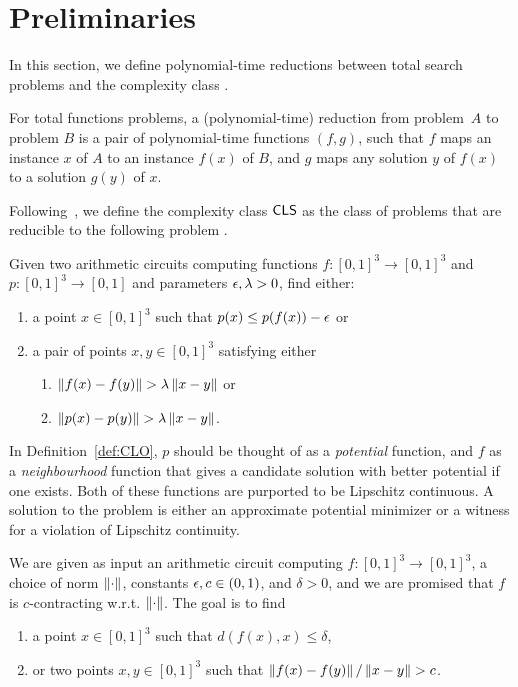 \chapter{Preliminaries}

In this section, we define polynomial-time reductions between total search problems
and the complexity class \CLS.
%
\begin{definition}
For total functions problems, a (polynomial-time) reduction from problem~$A$ to
problem $B$ is a pair of polynomial-time functions $(f,g)$, such that $f$ 
maps an instance $x$ of $A$ to an instance $f(x)$ of $B$, and $g$ maps
any solution $y$ of $f(x)$ to a solution $g(y)$ of $x$.
\end{definition}
%
Following~\cite{daskalakis2011continuous}, we define the complexity class $\mathsf{CLS}$
as the class of problems that are reducible to the following problem \CLO.

\begin{definition}
\label{def:CLO}
Given two arithmetic circuits computing functions $f : [0,1]^3\to [0,1]^3$ and $p :
[0,1]^3 \to [0,1]$ and parameters $\epsilon, \lambda > 0$, find either:
\begin{enumerate}[leftmargin=*,label=(C\arabic*)]
\item a point $x\in [0,1]^3$ such that $p(x) \leq p(f(x)) - \epsilon$ or \label{c_fixpoint}
\item a pair of points $x,y\in [0,1]^3$ satisfying either \label{c_violation}
  \begin{enumerate}[label=(C\arabic{enumi}\alph*)] 
  \item $\left\| f(x) - f(y) \right\| > \lambda \left\| x-y \right\|$ or \label{c_bad_f}
  \item $\left\| p(x) - p(y) \right\| > \lambda \left\| x-y \right\|$. \label{c_bad_p}
  \end{enumerate}
\end{enumerate}
\end{definition}

In Definition~\ref{def:CLO}, $p$ should be thought of as a \emph{potential}
function, and $f$ as a \emph{neighbourhood} function that gives a candidate
solution with better potential if one exists. Both of these functions are 
purported to be Lipschitz continuous. A solution to the problem is either an approximate
potential minimizer or a witness for a violation of Lipschitz continuity.

\begin{definition}
We are given as input an arithmetic circuit computing $f: [0,1]^3\to [0,1]^3$,
a choice of norm $\left\| \cdot \right\|$, constants \mbox{$\epsilon,c \in (0,1)$},
and $\delta > 0$, and we are promised that $f$ is $c$-contracting w.r.t. $\left\| \cdot \right\|$.
The goal is to find
\begin{enumerate}[label=(CM\arabic*)]
\item a point $x\in [0,1]^3$ such that $d(f(x),x) \leq \delta$, 
\item or two points $x,y\in [0,1]^3$ such that $\left\| f(x) - f(y) \right\|/\left\| x-y \right\| > c$. 
\end{enumerate}
\end{definition}

